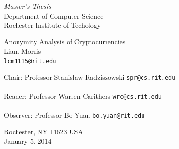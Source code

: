 \documentclass[11pt]{article}
\begin{document}
\thispagestyle{empty}
\begin{center}
    \begin{Large}
        \emph{Master's Thesis} \\
        Department of Computer Science \\
        Rochester Institute of Techology \\
    \end{Large}
    \vspace{4em}
    {\huge Anonymity Analysis of Cryptocurrencies} \\
    \vspace{3em}
    {\LARGE Liam Morris} \\
    {\tt lcm1115@rit.edu} \\
    \vspace{3em}
    \begin{adjustwidth}{.5in}{.5in}
        Chair: Professor Stanis{\l}aw Radziszowski \hfill {\tt spr@cs.rit.edu} \\
        \vspace{2em}
        \hrulefill \\
        \vspace{3em}
        Reader: Professor Warren Carithers \hfill {\tt wrc@cs.rit.edu} \\
        \vspace{2em}
        \hrulefill \\
        \vspace{3em} Observer: Professor Bo Yuan \hfill {\tt bo.yuan@rit.edu} \\
        \vspace{2em}
        \hrulefill
    \end{adjustwidth}
    \vspace{2em} Rochester, NY 14623 USA \\
    \vspace{2em}
    January 5, 2014
\end{center}
\pagebreak
\thispagestyle{empty}
\end{document}
